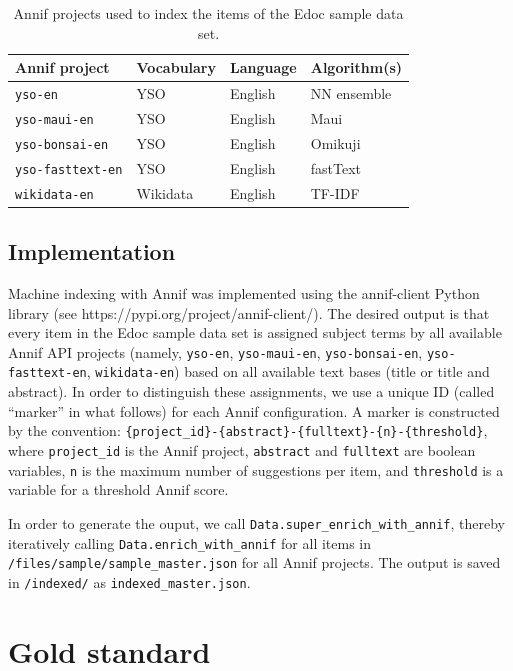 \begin{table}[]
\centering
\begin{tabular}{llll}
Annif project   & Vocabulary & Language & Algorithm(s)   \\ \hline
\texttt{yso-en}  & YSO        & English  & NN ensemble \\
\texttt{yso-maui-en}     & YSO        & English  & Maui        \\
\texttt{yso-bonsai-en}   & YSO        & English  & Omikuji     \\
\texttt{yso-fasttext-en} & YSO        & English  & fastText    \\
\texttt{wikidata-en}     & Wikidata   & English  & TF-IDF     
\end{tabular}
\caption{Annif projects used to index the items of the Edoc sample data set.}
\label{tab:my-table}
\end{table}

\hypertarget{implementation}{%
\subsection{Implementation}\label{implementation}}

Machine indexing with Annif was implemented using the annif-client
Python library (see https://pypi.org/project/annif-client/). The desired
output is that every item in the Edoc sample data set is assigned
subject terms by all available Annif API projects (namely,
\texttt{yso-en}, \texttt{yso-maui-en}, \texttt{yso-bonsai-en},
\texttt{yso-fasttext-en}, \texttt{wikidata-en}) based on all available
text bases (title or title and abstract). In order to distinguish these
assignments, we use a unique ID (called ``marker'' in what follows) for
each Annif configuration. A marker is constructed by the convention:
\texttt{\{project\_id\}-\{abstract\}-\{fulltext\}-\{n\}-\{threshold\}},
where \texttt{project\_id} is the Annif project, \texttt{abstract} and
\texttt{fulltext} are boolean variables, \texttt{n} is the maximum
number of suggestions per item, and \texttt{threshold} is a variable for
a threshold Annif score.

In order to generate the ouput, we call
\texttt{Data.super\_enrich\_with\_annif}, thereby iteratively calling
\texttt{Data.enrich\_with\_annif} for all items in
\texttt{/files/sample/sample\_master.json} for all Annif projects. The
output is saved in \texttt{/indexed/} as \texttt{indexed\_master.json}.

\hypertarget{gold-standard}{%
\section{Gold standard}\label{gold-standard}}

